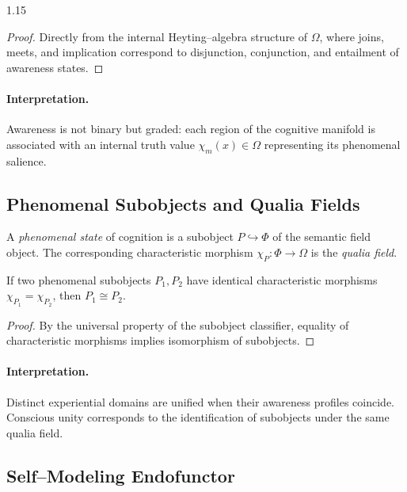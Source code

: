 \documentclass[12pt,a4paper]{article}
\begin{document}
\begin{spacing}{1.15}
\begin{proof}
Directly from the internal Heyting–algebra structure of \(\Omega\),
where joins, meets, and implication correspond to disjunction, conjunction,
and entailment of awareness states.
\end{proof}

\paragraph{Interpretation.}
Awareness is not binary but graded:
each region of the cognitive manifold
is associated with an internal truth value \(\chi_m(x)\in\Omega\)
representing its phenomenal salience.

\subsection{Phenomenal Subobjects and Qualia Fields}

\begin{definition}
\label{def:phenomenal}
A \emph{phenomenal state} of cognition is a subobject
\(P \hookrightarrow \Phi\)
of the semantic field object.
The corresponding characteristic morphism
\(\chi_P : \Phi \to \Omega\)
is the \emph{qualia field}.
\end{definition}

\begin{proposition}
\label{prop:unity}
If two phenomenal subobjects \(P_1,P_2\)
have identical characteristic morphisms
\(\chi_{P_1}=\chi_{P_2}\),
then \(P_1\cong P_2\).
\end{proposition}

\begin{proof}
By the universal property of the subobject classifier,
equality of characteristic morphisms implies
isomorphism of subobjects.
\end{proof}

\paragraph{Interpretation.}
Distinct experiential domains are unified when their awareness profiles coincide.
Conscious unity corresponds to the identification of subobjects under the same
qualia field.

\subsection{Self–Modeling Endofunctor}


\end{spacing}
\end{document}
